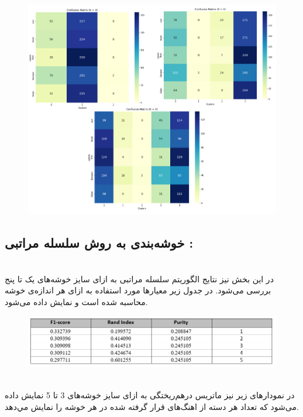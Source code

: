 \documentclass[10pt,onecolumn,a4paper]{article}
\begin{document}
\begin{figure}[h!]
        \centering
        \includegraphics[scale=0.45]{km3.png}
        \caption{  }  
    \end{figure}

\pagebreak



\subsection{خوشه‌بندی به روش سلسله مراتبی :}

\\
در این بخش نیز نتایج الگوریتم‌ سلسله مراتبی به ازای سایز خوشه‌های یک تا پنج بررسی می‌شود. در جدول زیر معیارها مورد استفاده به ازای هر اندازه‌ی خوشه محاسبه شده است و نمایش داده می‌شود. 
\\
\begin{figure}[h!]
        \centering
        \includegraphics[scale=0.45]{km4.PNG}
        
    \end{figure}
\\
در نمودارهای زیر نیز ماتریس درهم‌ریختگی به ازای سایز خوشه‌های 3 تا 5 نمایش داده‌ می‌شود که تعداد هر دسته‌ از اهنگ‌های قرار گرفته شده در هر خوشه را نمايش مي‌دهد. 
\\
\end{document}
